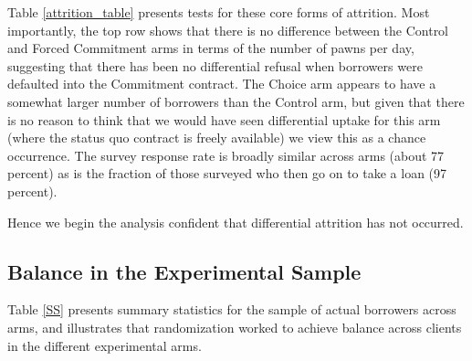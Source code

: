 \documentclass[oneside,11pt]{article}
\begin{document}
Table \ref{attrition_table} presents tests for these core forms of attrition.  Most importantly, the top row shows that there is no difference between the Control and Forced Commitment arms in terms of the number of pawns per day, suggesting that there has been no differential refusal when borrowers were defaulted into the Commitment contract.  The Choice arm appears to have a somewhat larger number of borrowers than the Control arm, but given that there is no reason to think that we would have seen differential uptake for this arm (where the status quo contract is freely available) we view this as a chance occurrence.  The survey response rate is broadly similar across arms (about 77 percent) as is the fraction of those surveyed who then go on to take a loan (97 percent).  

Hence we begin the analysis confident that differential attrition has not occurred.  




   



    
\subsection{Balance in the Experimental Sample}
Table \ref{SS} presents summary statistics for the sample of actual borrowers across arms, and illustrates that randomization worked to achieve balance across clients in the different experimental arms. 
\end{document}
